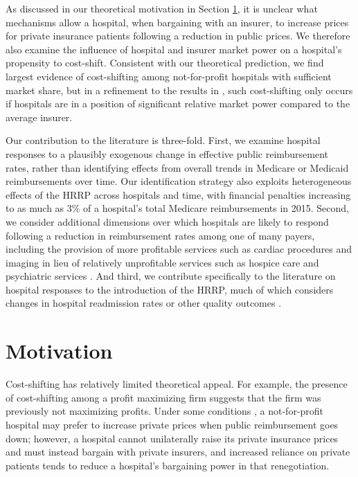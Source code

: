 \documentclass[12pt]{article}
\begin{document}
As discussed in our theoretical motivation in Section \ref{sec:motivation}, it is unclear what mechanisms allow a hospital, when bargaining with an insurer, to increase prices for private insurance patients following a reduction in public prices. We therefore also examine the influence of hospital and insurer market power on a hospital's propensity to cost-shift. Consistent with our theoretical prediction, we find largest evidence of cost-shifting among not-for-profit hospitals with sufficient market share, but in a refinement to the results in \cite{dranove2017}, such cost-shifting only occurs if hospitals are in a position of significant relative market power compared to the average insurer.

Our contribution to the literature is three-fold. First, we examine hospital responses to a plausibly exogenous change in effective public reimbursement rates, rather than identifying effects from overall trends in Medicare or Medicaid reimbursements over time. Our identification strategy also exploits heterogeneous effects of the HRRP across hospitals and time, with financial penalties increasing to as much as 3\% of a hospital's total Medicare reimbursements in 2015. Second, we consider additional dimensions over which hospitals are likely to respond following a reduction in reimbursement rates among one of many payers, including the provision of more profitable services such as cardiac procedures and imaging in lieu of relatively unprofitable services such as hospice care and psychiatric services \citep{horwitz2009}. And third, we contribute specifically to the literature on hospital responses to the introduction of the HRRP, much of which considers changes in hospital readmission rates or other quality outcomes \citep{carey2015,mellor2016}.


\section{Motivation}
\label{sec:motivation}
Cost-shifting has relatively limited theoretical appeal. For example, the presence of cost-shifting among a profit maximizing firm suggests that the firm was previously not maximizing profits. Under some conditions \citep{dranove1988}, a not-for-profit hospital may prefer to increase private prices when public reimbursement goes down; however, a hospital cannot unilaterally raise its private insurance prices and must instead bargain with private insurers, and increased reliance on private patients tends to reduce a hospital's bargaining power in that renegotiation.
\end{document}
